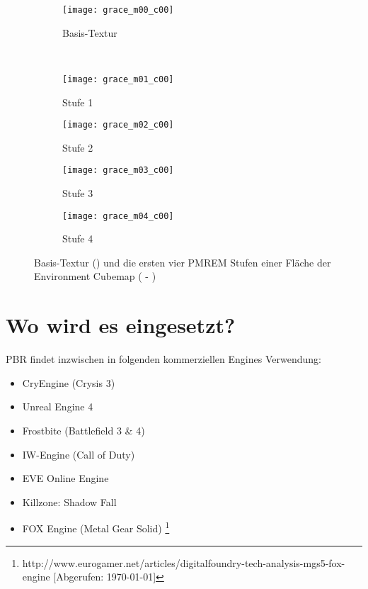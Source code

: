 \begin{figure}
\centering
\begin{subfigure}{0.18\textwidth}
	\texttt{[image: grace\_m00\_c00]}
	\caption{Basis-Textur}\label{fig:pmrem-basis}
\end{subfigure}
~
\begin{subfigure}{0.18\textwidth}
	\texttt{[image: grace\_m01\_c00]}
	\caption{Stufe 1}\label{fig:pmrem-1}
\end{subfigure}
\begin{subfigure}{0.18\textwidth}
	\texttt{[image: grace\_m02\_c00]}
	\caption{Stufe 2}\label{fig:pmrem-2}
\end{subfigure}
\begin{subfigure}{0.18\textwidth}
	\texttt{[image: grace\_m03\_c00]}
	\caption{Stufe 3}\label{fig:pmrem-3}
\end{subfigure}
\begin{subfigure}{0.18\textwidth}
	\texttt{[image: grace\_m04\_c00]}
	\caption{Stufe 4}\label{fig:pmrem-4}
\end{subfigure}
\caption[Beispiel einer PMREM Textur]{Basis-Textur () und die ersten vier \ac{PMREM} Stufen einer Fläche der Environment Cubemap ( - )}
\end{figure}

\section{Wo wird es eingesetzt?}
\label{sec:pbr-wo}

\ac{PBR} findet inzwischen in folgenden kommerziellen Engines Verwendung:
\begin{itemize}
\item CryEngine (Crysis 3) \parencite{Schulz2014}
\item Unreal Engine 4 \parencite{Martin2012}
\item Frostbite (Battlefield 3 \& 4) \parencite{Lagarde2014}
\item IW-Engine (Call of Duty) \parencite{Lazarov2011}
\item EVE Online Engine \parencite{CCP2014}
\item Killzone: Shadow Fall \parencite{Drobot2013}
\item FOX Engine (Metal Gear Solid) \footnote{http://www.eurogamer.net/articles/digitalfoundry-tech-analysis-mgs5-fox-engine [Abgerufen: \today]}
\end{itemize}
